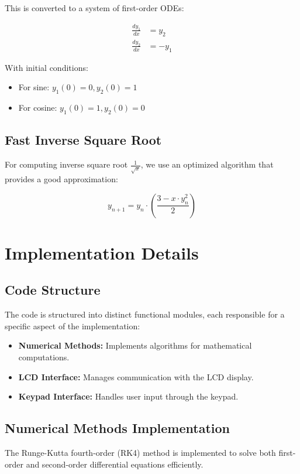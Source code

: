 \documentclass[12pt,a4paper]{article}
\begin{document}
This is converted to a system of first-order ODEs:

\begin{align}
\frac{dy_1}{dx} &= y_2 \\
\frac{dy_2}{dx} &= -y_1
\end{align}

With initial conditions:
\begin{itemize}
    \item For sine: $y_1(0) = 0, y_2(0) = 1$
    \item For cosine: $y_1(0) = 1, y_2(0) = 0$
\end{itemize}


\subsection{Fast Inverse Square Root}
For computing inverse square root $\frac{1}{\sqrt{x}}$, we use an optimized algorithm that provides a good approximation:

\begin{equation}
y_{n+1} = y_n \cdot \left(\frac{3 - x \cdot y_n^2}{2}\right)
\end{equation}

\section{Implementation Details}

\subsection{Code Structure}
The code is structured into distinct functional modules, each responsible for a specific aspect of the implementation:
\begin{itemize}
    \item \textbf{Numerical Methods:} Implements algorithms for mathematical computations.
    \item \textbf{LCD Interface:} Manages communication with the LCD display.
    \item \textbf{Keypad Interface:} Handles user input through the keypad.
\end{itemize}

\subsection{Numerical Methods Implementation}
The Runge-Kutta fourth-order (RK4) method is implemented to solve both first-order and second-order differential equations efficiently.
\end{document}
